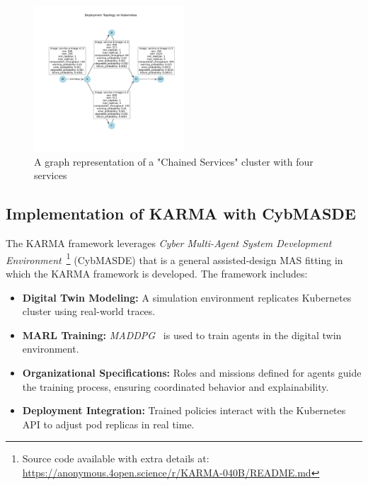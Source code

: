 \documentclass[conference]{IEEEtran}
\begin{document}
\begin{figure}[h!]
    \centering
    \hspace{-0.4cm}
    \includegraphics[trim=1.8cm 3.3cm 1.25cm 3.5cm, clip, width=0.5\textwidth]{figures/k8s_cluster_graph.pdf}
    \caption{A graph representation of a "Chained Services" cluster with four services}
    \label{fig:chained_services_graph}
\end{figure}

\subsection{Implementation of KARMA with CybMASDE}


The KARMA framework leverages \textit{Cyber Multi-Agent System Development Environment}~\footnote{Source code available with extra details
at: \url{https://anonymous.4open.science/r/KARMA-040B/README.md}} (CybMASDE) that is a general assisted-design MAS fitting in which the KARMA framework is developed. The framework includes:
\begin{itemize}
    \item \textbf{Digital Twin Modeling:} A simulation environment replicates Kubernetes cluster using real-world traces.
    \item \textbf{MARL Training:} \textit{MADDPG}~\cite{lowe2017multi} is used to train agents in the digital twin environment.
    \item \textbf{Organizational Specifications:} Roles and missions defined for agents guide the training process, ensuring coordinated behavior and explainability.
    \item \textbf{Deployment Integration:} Trained policies interact with the Kubernetes API to adjust pod replicas in real time.
\end{itemize}
\end{document}
